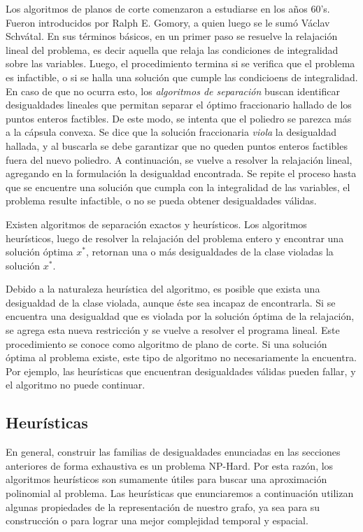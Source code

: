 Los algoritmos de planos de corte comenzaron a estudiarse en los años 60's. Fueron introducidos por Ralph E. Gomory, a quien luego se le sumó Václav Schvátal. En sus términos básicos, en un primer paso se resuelve la relajación lineal del problema, es decir aquella que relaja las condiciones de integralidad sobre las variables. Luego, el procedimiento termina si se verifica que el problema es infactible, o si se halla una solución que cumple las condicioens de integralidad. En caso de que no ocurra esto, los \textit{algoritmos de separación} buscan identificar desigualdades lineales que permitan separar el óptimo fraccionario hallado de los puntos enteros factibles. De este modo, se intenta que el poliedro se parezca más a la cápsula convexa. Se dice que la solución fraccionaria \textit{viola} la desigualdad hallada, y al buscarla se debe garantizar que no queden puntos enteros factibles fuera del nuevo poliedro. A continuación, se vuelve a resolver la relajación lineal, agregando en la formulación la desigualdad encontrada. Se repite el proceso hasta que se encuentre una solución que cumpla con la integralidad de las variables, el problema resulte infactible, o no se pueda obtener desigualdades válidas.

Existen algoritmos de separación exactos y heurísticos. Los algoritmos heurísticos, luego de resolver la relajación del problema entero y encontrar una solución óptima $x^*$, retornan una o más desigualdades de la clase violadas la solución $x^*$.

Debido a la naturaleza heurística del algoritmo, es posible que exista una desigualdad de la clase violada, aunque éste sea incapaz de encontrarla. Si se encuentra una desigualdad que es violada por la solución óptima de la relajación, se agrega esta nueva restricción y se vuelve a resolver el programa lineal. Este procedimiento se conoce como algoritmo de plano de corte. Si una solución óptima al problema existe, este tipo de algoritmo no necesariamente la encuentra. Por ejemplo, las heurísticas que encuentran desigualdades válidas pueden fallar, y el algoritmo no puede continuar.

\subsection{Heurísticas}

En general, construir las familias de desigualdades enunciadas en las secciones anteriores de forma exhaustiva es un problema NP-Hard. Por esta razón, los algoritmos heurísticos son sumamente útiles para buscar una aproximación polinomial al problema. Las heurísticas que enunciaremos a continuación utilizan algunas propiedades de la representación de nuestro grafo, ya sea para su construcción o para lograr una mejor complejidad temporal y espacial.

